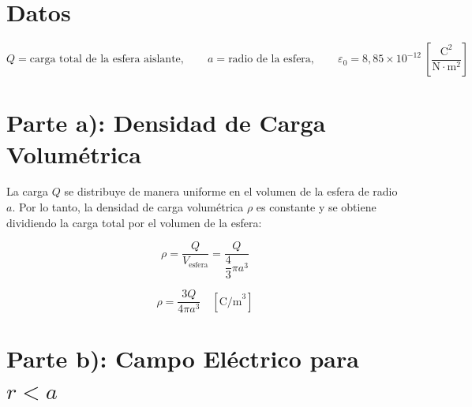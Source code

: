 \documentclass[12pt,letterpaper]{article}
\begin{document}
\section*{Datos}

\[
    Q = \text{carga total de la esfera aislante},
    \qquad
    a = \text{radio de la esfera},
    \qquad
    \varepsilon_0 = 8{,}85 \times 10^{-12}
    \ \left[\frac{\text{C}^2}{\text{N}\cdot\text{m}^2}\right]
\]

\section*{Parte a): Densidad de Carga Volum\'etrica}

La carga $Q$ se distribuye de manera uniforme en el volumen de la esfera de radio $a$.
Por lo tanto, la densidad de carga volum\'etrica $\rho$ es constante y se obtiene
dividiendo la carga total por el volumen de la esfera:

\[
    \rho = \frac{Q}{V_\text{esfera}} = \frac{Q}{\dfrac{4}{3}\pi a^3}
\]

\[
    \boxed{\rho = \frac{3Q}{4\pi a^3} \quad \left[\text{C/m}^3\right]}
\]

\bigskip

\section*{Parte b): Campo El\'ectrico para $r < a$}
\end{document}
